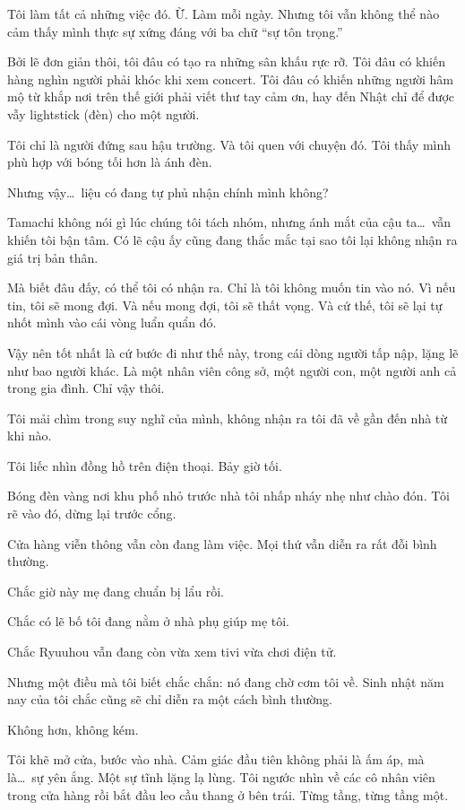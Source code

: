 \documentclass[../main.tex]{subfiles}
\begin{document}
Tôi làm tất cả những việc đó. Ừ. Làm mỗi ngày. Nhưng tôi vẫn không thể nào cảm thấy mình thực sự xứng đáng với ba chữ ``sự tôn trọng.''

Bởi lẽ đơn giản thôi, tôi đâu có tạo ra những sân khấu rực rỡ. Tôi đâu có khiến hàng nghìn người phải khóc khi xem concert. Tôi đâu có khiến những người hâm mộ từ khắp nơi trên thế giới phải viết thư tay cảm ơn, hay đến Nhật chỉ để được vẫy lightstick (đèn) cho một người.

Tôi chỉ là người đứng sau hậu trường. Và tôi quen với chuyện đó. Tôi thấy mình phù hợp với bóng tối hơn là ánh đèn.

Nhưng vậy\dots\ liệu có đang tự phủ nhận chính mình không?

Tamachi không nói gì lúc chúng tôi tách nhóm, nhưng ánh mắt của cậu ta\dots\ vẫn khiến tôi bận tâm. Có lẽ cậu ấy cũng đang thắc mắc tại sao tôi lại không nhận ra giá trị bản thân.

Mà biết đâu đấy, có thể tôi có nhận ra. Chỉ là tôi không muốn tin vào nó. Vì nếu tin, tôi sẽ mong đợi. Và nếu mong đợi, tôi sẽ thất vọng. Và cứ thế, tôi sẽ lại tự nhốt mình vào cái vòng luẩn quẩn đó.

Vậy nên tốt nhất là cứ bước đi như thế này, trong cái dòng người tấp nập, lặng lẽ như bao người khác. Là một nhân viên công sở, một người con, một người anh cả trong gia đình. Chỉ vậy thôi.

Tôi mải chìm trong suy nghĩ của mình, không nhận ra tôi đã về gần đến nhà từ khi nào.

Tôi liếc nhìn đồng hồ trên điện thoại. Bảy giờ tối.

Bóng đèn vàng nơi khu phố nhỏ trước nhà tôi nhấp nháy nhẹ như chào đón. Tôi rẽ vào đó, dừng lại trước cổng.

Cửa hàng viễn thông vẫn còn đang làm việc. Mọi thứ vẫn diễn ra rất đỗi bình thường.

Chắc giờ này mẹ đang chuẩn bị lẩu rồi.

Chắc có lẽ bố tôi đang nằm ở nhà phụ giúp mẹ tôi.

Chắc Ryuuhou vẫn đang còn vừa xem tivi vừa chơi điện tử.

Nhưng một điều mà tôi biết chắc chắn: nó đang chờ cơm tôi về. Sinh nhật năm nay của tôi chắc cũng sẽ chỉ diễn ra một cách bình thường.

Không hơn, không kém.

\ct

Tôi khẽ mở cửa, bước vào nhà. Cảm giác đầu tiên không phải là ấm áp, mà là\dots\ sự yên ắng. Một sự tĩnh lặng lạ lùng. Tôi ngước nhìn về các cô nhân viên trong cửa hàng rồi bắt đầu leo cầu thang ở bên trái. Từng tầng, từng tầng một.
\end{document}
